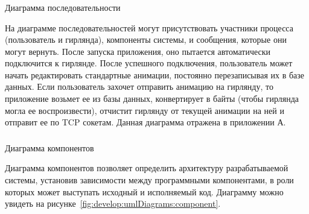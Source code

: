 \subsubsection{} Диаграмма последовательности
\label{sec:develop:umlDiagrams:sequence}

На диаграмме последовательностей могут присутствовать участники процесса (пользователь и гирлянда), компоненты системы, и сообщения, которые они могут вернуть. После запуска приложения, оно пытается автоматически подключится к гирлянде. После успешного подключения, пользователь может начать редактировать стандартные анимации, постоянно перезаписывая их в базе данных. Если пользователь захочет отправить анимацию на гирлянду, то приложение возьмет ее из базы данных, конвертирует в байты (чтобы гирлянда могла ее воспроизвести), отчистит гирлянду от текущей анимации на ней и отправит ее по TCP сокетам. Данная диаграмма отражена в приложении А.

\subsubsection{} Диаграмма компонентов
\label{sec:develop:umlDiagrams:component}

Диаграмма компонентов позволяет определить архитектуру разрабатываемой системы, установив зависимости между программными компонентами, в роли которых может выступать исходный  и исполняемый код. Диаграмму можно увидеть на рисунке~\ref{fig:develop:umlDiagrams:component}.

